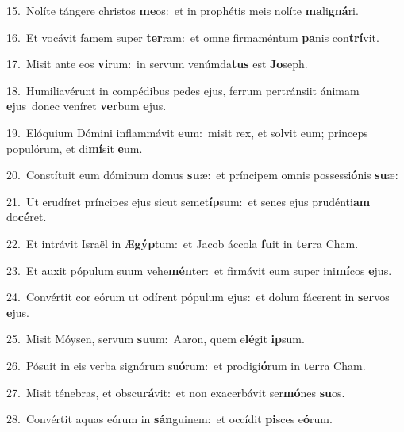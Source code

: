 {\numbfont\textcolor{\numbcolor}{15.}}~Nolíte tángere christos \textbf{me}\-os:~\star et in prophétis meis nolíte \textbf{ma}\-li\-\textbf{gná}\-ri.\par
{\numbfont\textcolor{\numbcolor}{16.}}~Et vocávit famem super \textbf{ter}\-ram:~\star et omne firmaméntum \textbf{pa}\-nis con\-\textbf{trí}\-vit.\par
{\numbfont\textcolor{\numbcolor}{17.}}~Misit ante eos \textbf{vi}\-rum:~\star in servum venúmda\textbf{tus} est \textbf{Jo}\-seph.\par
{\numbfont\textcolor{\numbcolor}{18.}}~Humiliavérunt in compédibus pedes ejus, ferrum pertránsiit ánimam \textbf{e}\-jus~\star donec veníret \textbf{ver}\-bum \textbf{e}\-jus.\par
{\numbfont\textcolor{\numbcolor}{19.}}~Elóquium Dómini inflammávit \textbf{e}\-um:~\star misit rex, et solvit eum; princeps populórum, et di\-\textbf{mí}\-sit \textbf{e}\-um.\par
{\numbfont\textcolor{\numbcolor}{20.}}~Constítuit eum dóminum domus \textbf{su}\-æ:~\star et príncipem omnis possessi\-\textbf{ó}\-nis \textbf{su}\-æ:\par
{\numbfont\textcolor{\numbcolor}{21.}}~Ut erudíret príncipes ejus sicut semet\-\textbf{íp}\-sum:~\star et senes ejus prudénti\textbf{am} do\-\textbf{cé}\-ret.\par
{\numbfont\textcolor{\numbcolor}{22.}}~Et intrávit Israël in Æ\-\textbf{gýp}\-tum:~\star et Jacob áccola \textbf{fu}\-it in \textbf{ter}\-ra Cham.\par
{\numbfont\textcolor{\numbcolor}{23.}}~Et auxit pópulum suum vehe\-\textbf{mén}\-ter:~\star et firmávit eum super ini\-\textbf{mí}\-cos \textbf{e}\-jus.\par
{\numbfont\textcolor{\numbcolor}{24.}}~Convértit cor eórum ut odírent pópulum \textbf{e}\-jus:~\star et dolum fácerent in \textbf{ser}\-vos \textbf{e}\-jus.\par
{\numbfont\textcolor{\numbcolor}{25.}}~Misit Móysen, servum \textbf{su}\-um:~\star Aaron, quem e\-\textbf{lé}\-git \textbf{ip}\-sum.\par
{\numbfont\textcolor{\numbcolor}{26.}}~Pósuit in eis verba signórum su\-\textbf{ó}\-rum:~\star et prodigi\-\textbf{ó}\-rum in \textbf{ter}\-ra Cham.\par
{\numbfont\textcolor{\numbcolor}{27.}}~Misit ténebras, et obscu\-\textbf{rá}\-vit:~\star et non exacerbávit ser\-\textbf{mó}\-nes \textbf{su}\-os.\par
{\numbfont\textcolor{\numbcolor}{28.}}~Convértit aquas eórum in \textbf{sán}\-guinem:~\star et occídit \textbf{pi}\-sces e\-\textbf{ó}\-rum.\par
